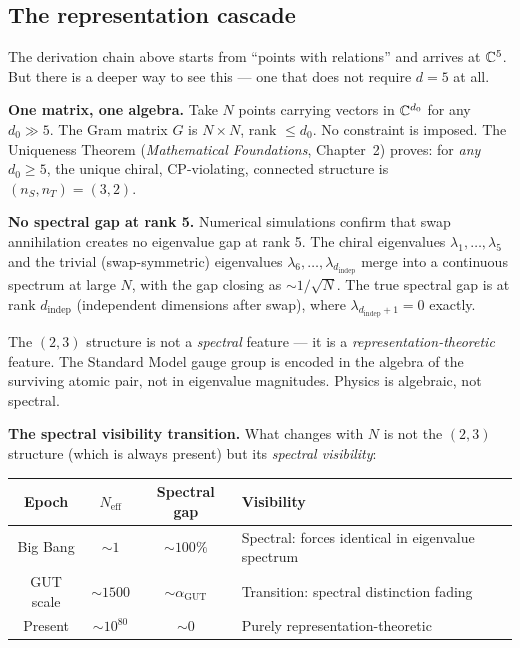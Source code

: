 \subsection{The representation cascade}

The derivation chain above starts from ``points with relations'' and arrives at $\mathbb{C}^5$. But there is a deeper way to see this --- one that does not require $d = 5$ at all.

\textbf{One matrix, one algebra.} Take $N$ points carrying vectors in $\mathbb{C}^{d_0}$ for any $d_0 \gg 5$. The Gram matrix $G$ is $N \times N$, rank $\leq d_0$. No constraint is imposed. The Uniqueness Theorem (\textit{Mathematical Foundations}, Chapter~2) proves: for \emph{any} $d_0 \geq 5$, the unique chiral, CP-violating, connected structure is $(n_S, n_T) = (3, 2)$.

\textbf{No spectral gap at rank 5.} Numerical simulations confirm that swap annihilation creates no eigenvalue gap at rank 5. The chiral eigenvalues $\lambda_1, \ldots, \lambda_5$ and the trivial (swap-symmetric) eigenvalues $\lambda_6, \ldots, \lambda_{d_\text{indep}}$ merge into a continuous spectrum at large $N$, with the gap closing as $\sim 1/\sqrt{N}$. The true spectral gap is at rank $d_\text{indep}$ (independent dimensions after swap), where $\lambda_{d_\text{indep}+1} = 0$ exactly.

The $(2,3)$ structure is not a \emph{spectral} feature --- it is a \emph{representation-theoretic} feature. The Standard Model gauge group is encoded in the algebra of the surviving atomic pair, not in eigenvalue magnitudes. Physics is algebraic, not spectral.

\textbf{The spectral visibility transition.} What changes with $N$ is not the $(2,3)$ structure (which is always present) but its \emph{spectral visibility}:

\begin{center}
\begin{tabular}{cccl}
\hline
Epoch & $N_\text{eff}$ & Spectral gap & Visibility \\
\hline
Big Bang & $\sim 1$ & $\sim 100\%$ & Spectral: forces identical in eigenvalue spectrum \\
GUT scale & $\sim 1500$ & $\sim \alpha_\text{GUT}$ & Transition: spectral distinction fading \\
Present & $\sim 10^{80}$ & $\sim 0$ & Purely representation-theoretic \\
\hline
\end{tabular}
\end{center}

